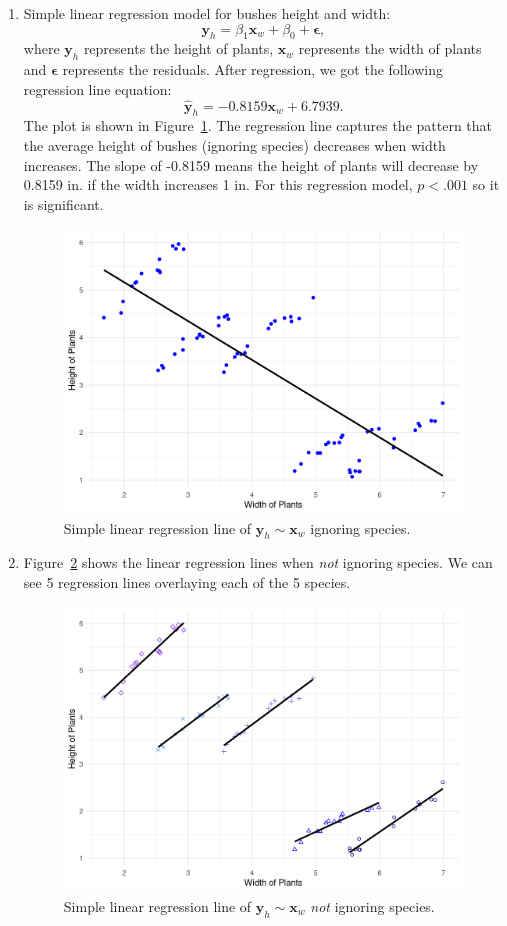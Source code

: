 \documentclass[12pt]{article}
\begin{document}
\begin{enumerate}

\item Simple linear regression model for bushes height and width:
\[
\mathbf{y}_{h} = \beta_1\mathbf{x}_w + \beta_0 + \mathbf{\epsilon} ,\] 
where $\mathbf{y}_h$ represents the height of plants, $\mathbf{x}_w$ represents the width of plants and $\mathbf{\epsilon}$ represents the residuals. After regression, we got the following regression line equation:
\[
\hat{ \mathbf{y} }_{h} = -0.8159\mathbf{x}_w + 6.7939
.\] 
The plot is shown in Figure~\ref{Fig:3}. The regression line captures the pattern that the average height of bushes (ignoring species) decreases when width increases. The slope of -0.8159 means the height of plants will decrease by 0.8159 in. if the width increases 1 in. For this regression model, $p < .001$ so it is significant.

\begin{figure}[htbp]
\includegraphics[width=.7\textwidth]{3.png}
\centering
\caption{Simple linear regression line of $\mathbf{y}_h \sim \mathbf{x}_w$ ignoring species.}
\label{Fig:3}
\end{figure}

\item Figure~\ref{Fig:4} shows the linear regression lines when {\em not} ignoring species. We can see 5 regression lines overlaying each of the 5 species.

\begin{figure}[htbp]
\includegraphics[width=.7\textwidth]{4.png}
\centering
\caption{Simple linear regression line of $\mathbf{y}_h \sim \mathbf{x}_w$ {\em not }ignoring species.}
\label{Fig:4}
\end{figure}


\end{enumerate}
\end{document}
